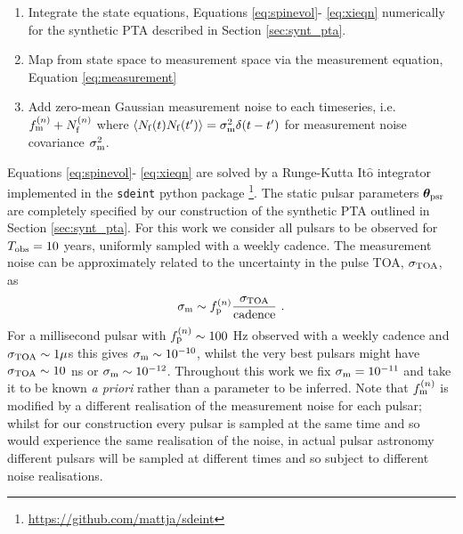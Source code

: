 \documentclass[fleqn,usenatbib,useAMS]{mnras}
\begin{document}
\begin{enumerate}
	\item Integrate the state equations, Equations \eqref{eq:spinevol}- \eqref{eq:xieqn} numerically for the synthetic PTA described in Section \ref{sec:synt_pta}.
	\item Map from state space to measurement space via the measurement equation, Equation \eqref{eq:measurement}
	\item Add zero-mean Gaussian measurement noise to each timeseries, i.e. $f_{\rm m} ^{(n)} + N_{\rm f}^{(n)}$ where 	$\langle N_{\rm f}(t) N_{\rm f}(t') \rangle = \sigma_{\rm m}^2 \delta(t - t')$ for measurement noise covariance $\sigma_{\rm m}^2$.
\end{enumerate}
Equations \eqref{eq:spinevol}- \eqref{eq:xieqn} are solved by a Runge-Kutta It$\hat{\text{o}}$ integrator implemented in the \texttt{sdeint} python package \footnote{\url{https://github.com/mattja/sdeint}}. The static pulsar parameters  $\boldsymbol{\theta}_{\rm psr}$ are completely specified by our construction of the synthetic PTA outlined in Section \eqref{sec:synt_pta}. For this work we consider all pulsars to be observed for $T_{\rm obs} =10$ years, uniformly sampled with a weekly cadence. The measurement noise can be approximately related to the uncertainty in the pulse TOA, $\sigma_{\rm TOA}$, as
\begin{equation}
	\sigma_{\rm m} \sim f_{\rm p}^{(n)} \frac{\sigma_{\rm TOA}}{\text{cadence}} \ . 
\end{equation}
For a millisecond pulsar with $f_{\rm p}^{(n)} \sim 100$ Hz observed with a weekly cadence and $\sigma_{\rm TOA} \sim 1 \mu$s this gives $\sigma_{\rm m} \sim 10^{-10}$, whilst the very best pulsars might have $\sigma_{\rm TOA} \sim 10 $ ns or $\sigma_{\rm m} \sim 10^{-12}$. Throughout this work we fix $\sigma_{\rm m} = 10^{-11}$ and take it to be known \textit{a priori} rather than a parameter to be inferred. Note that $f_{\rm m} ^{(n)}$ is modified by a different realisation of the measurement noise for each pulsar; whilst for our construction every pulsar is sampled at the same time and so would experience the same realisation of the noise, in actual pulsar astronomy different pulsars will be sampled at different times and so subject to different noise realisations. \newline 
\end{document}
